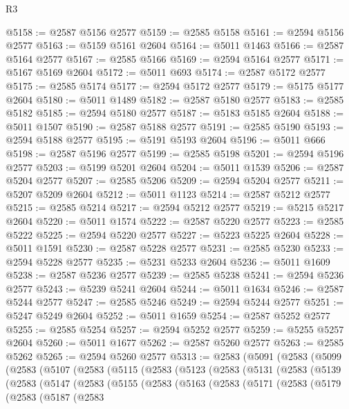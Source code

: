 \begin{lexlean}{R3}
\begin{coremodule}
@5158 := @2587 @5156 @2577
@5159 := @2585 @5158
@5161 := @2594 @5156 @2577
@5163 := @5159 @5161 @2604
@5164 := @5011 @1463
@5166 := @2587 @5164 @2577
@5167 := @2585 @5166
@5169 := @2594 @5164 @2577
@5171 := @5167 @5169 @2604
@5172 := @5011 @693
@5174 := @2587 @5172 @2577
@5175 := @2585 @5174
@5177 := @2594 @5172 @2577
@5179 := @5175 @5177 @2604
@5180 := @5011 @1489
@5182 := @2587 @5180 @2577
@5183 := @2585 @5182
@5185 := @2594 @5180 @2577
@5187 := @5183 @5185 @2604
@5188 := @5011 @1507
@5190 := @2587 @5188 @2577
@5191 := @2585 @5190
@5193 := @2594 @5188 @2577
@5195 := @5191 @5193 @2604
@5196 := @5011 @666
@5198 := @2587 @5196 @2577
@5199 := @2585 @5198
@5201 := @2594 @5196 @2577
@5203 := @5199 @5201 @2604
@5204 := @5011 @1539
@5206 := @2587 @5204 @2577
@5207 := @2585 @5206
@5209 := @2594 @5204 @2577
@5211 := @5207 @5209 @2604
@5212 := @5011 @1123
@5214 := @2587 @5212 @2577
@5215 := @2585 @5214
@5217 := @2594 @5212 @2577
@5219 := @5215 @5217 @2604
@5220 := @5011 @1574
@5222 := @2587 @5220 @2577
@5223 := @2585 @5222
@5225 := @2594 @5220 @2577
@5227 := @5223 @5225 @2604
@5228 := @5011 @1591
@5230 := @2587 @5228 @2577
@5231 := @2585 @5230
@5233 := @2594 @5228 @2577
@5235 := @5231 @5233 @2604
@5236 := @5011 @1609
@5238 := @2587 @5236 @2577
@5239 := @2585 @5238
@5241 := @2594 @5236 @2577
@5243 := @5239 @5241 @2604
@5244 := @5011 @1634
@5246 := @2587 @5244 @2577
@5247 := @2585 @5246
@5249 := @2594 @5244 @2577
@5251 := @5247 @5249 @2604
@5252 := @5011 @1659
@5254 := @2587 @5252 @2577
@5255 := @2585 @5254
@5257 := @2594 @5252 @2577
@5259 := @5255 @5257 @2604
@5260 := @5011 @1677
@5262 := @2587 @5260 @2577
@5263 := @2585 @5262
@5265 := @2594 @5260 @2577
@5313 := @2583
    (@5091
      (@2583
        (@5099
          (@2583
            (@5107
              (@2583
                (@5115
                  (@2583
                    (@5123
                      (@2583
                        (@5131
                          (@2583
                            (@5139
                              (@2583
                                (@5147
                                  (@2583
                                    (@5155
                                      (@2583
                                        (@5163
                                          (@2583
                                            (@5171
                                              (@2583
                                                (@5179
                                                  (@2583
                                                    (@5187
                                                      (@2583

\end{coremodule}
\end{lexlean}
